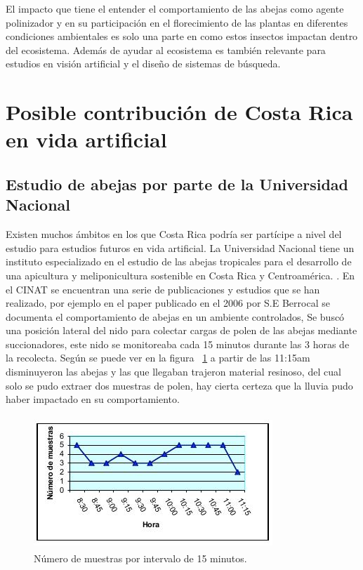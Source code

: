 \documentclass[conference]{IEEEtran}
\begin{document}
El impacto que tiene el entender el comportamiento de las abejas como agente polinizador y en su participaci\'on en el florecimiento de las plantas en diferentes condiciones ambientales es solo una parte en como estos insectos impactan dentro del ecosistema. Adem\'as de ayudar al ecosistema es tambi\'en relevante para estudios en visi\'on artificial y el dise\~no de sistemas de b\'usqueda. \cite{ZOE01}

\section{Posible contribuci\'on de Costa Rica en vida artificial}

\subsection{Estudio de abejas por parte de la Universidad Nacional}
Existen muchos \'ambitos en los que Costa Rica podr\'ia ser part\'icipe a nivel del estudio para estudios futuros en vida artificial. La Universidad Nacional tiene un instituto especializado en el estudio de las abejas tropicales para el desarrollo de una apicultura y meliponicultura sostenible en Costa Rica y Centroam\'erica. \cite{CINAT} . En el CINAT se encuentran una serie de publicaciones y estudios que se han realizado, por ejemplo en el paper publicado en el 2006 por S.E Berrocal se documenta el comportamiento de abejas en un ambiente controlados, Se busc\'o una posici\'on lateral del nido para colectar cargas de polen de las abejas mediante succionadores, este nido se monitoreaba cada 15 minutos durante las 3 horas de la recolecta. Seg\'un se puede ver en la figura ~\ref{fig:muestra} a partir de las 11:15am disminuyeron las abejas y las que llegaban trajeron material resinoso, del cual solo se pudo extraer dos muestras de polen, hay cierta certeza que la lluvia pudo haber impactado en su comportamiento.\cite{APICOLA}
\begin{figure}[ht]
  \includegraphics[width=9cm,height=5cm]{img/muestras.jpg}
  \caption{N\'umero de muestras por intervalo de 15 minutos. \cite{APICOLA}}
  \label{fig:muestra}
\end{figure}
\end{document}
